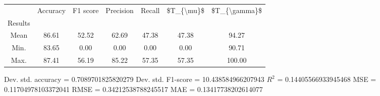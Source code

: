 \begin{tabular}{|c|c|c|c|c|c|c|}
\toprule
{} &  Accuracy &  F1 score &  Precision &  Recall &  \$T\_\{\textbackslash mu\}\$ &  \$T\_\{\textbackslash gamma\}\$ \\
Results &           &           &            &         &            &               \\
\hline
Mean    &     86.61 &     52.52 &      62.69 &   47.38 &      47.38 &         94.27 \\
Min.    &     83.65 &      0.00 &       0.00 &    0.00 &       0.00 &         90.71 \\
Max.    &     87.41 &     56.19 &      85.22 &   57.35 &      57.35 &        100.00 \\
\bottomrule
\end{tabular}

 Dev. std. accuracy = 0.7089701825820279
 Dev. std. F1-score = 10.438584966207943
 $R^2$ = 0.14405566933945468
 MSE = 0.11704978103372041
 RMSE = 0.34212538788245517
 MAE = 0.13417738202614077